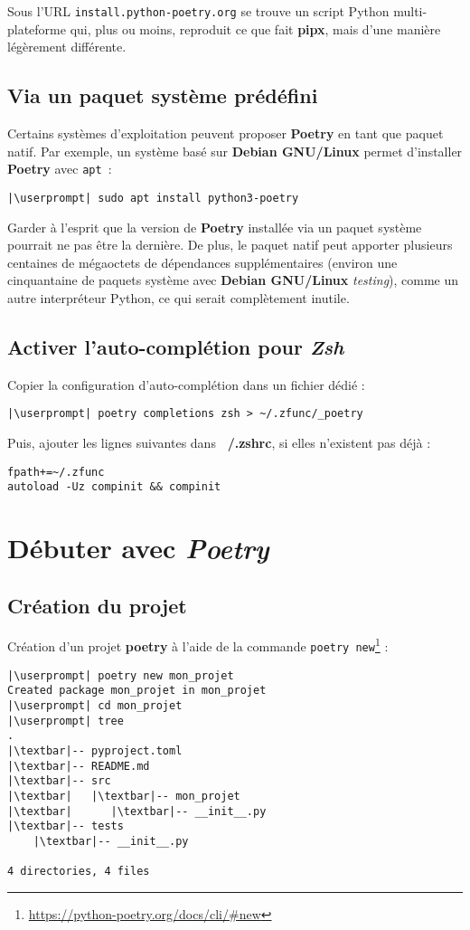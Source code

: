 Sous l’URL \texttt{install.python-poetry.org} se trouve un script Python multi-plateforme qui, plus ou moins, reproduit ce que fait \textbf{pipx}, mais d’une manière légèrement différente.

\subsection*{Via un paquet système prédéfini}
Certains systèmes d’exploitation peuvent proposer \textbf{Poetry} en tant que paquet natif. Par exemple, un système basé sur \textbf{Debian GNU/Linux} permet d’installer \textbf{Poetry} avec \texttt{apt} :
\begin{lstlisting}[style=bash]
|\userprompt| sudo apt install python3-poetry
\end{lstlisting}

Garder à l’esprit que la version de \textbf{Poetry} installée via un paquet système pourrait ne pas être la dernière. De plus, le paquet natif peut apporter plusieurs centaines de mégaoctets de dépendances supplémentaires (environ une cinquantaine de paquets système avec \textbf{Debian  GNU/Linux} \textit{testing}), comme un autre interpréteur Python, ce qui serait complètement inutile.

\subsection*{Activer l'auto-complétion  pour \textit{Zsh}}
Copier la configuration d'auto-complétion dans un fichier dédié :
\begin{lstlisting}[style=bash]
|\userprompt| poetry completions zsh > ~/.zfunc/_poetry
\end{lstlisting}

Puis, ajouter les lignes suivantes dans  \textbf{~/.zshrc}, si elles n'existent pas déjà :
\begin{lstlisting}[style=file]
fpath+=~/.zfunc
autoload -Uz compinit && compinit
\end{lstlisting}

\section{Débuter avec \textit{Poetry}}
\subsection*{Création du projet}
Création d'un projet \textbf{poetry} à l'aide de la commande \texttt{poetry new}\footnote{\url{https://python-poetry.org/docs/cli/\#new}} :
\begin{lstlisting}[style=bash]
|\userprompt| poetry new mon_projet
Created package mon_projet in mon_projet
|\userprompt| cd mon_projet
|\userprompt| tree
.
|\textbar|-- pyproject.toml
|\textbar|-- README.md
|\textbar|-- src
|\textbar|   |\textbar|-- mon_projet
|\textbar|      |\textbar|-- __init__.py
|\textbar|-- tests
    |\textbar|-- __init__.py

4 directories, 4 files
\end{lstlisting}

